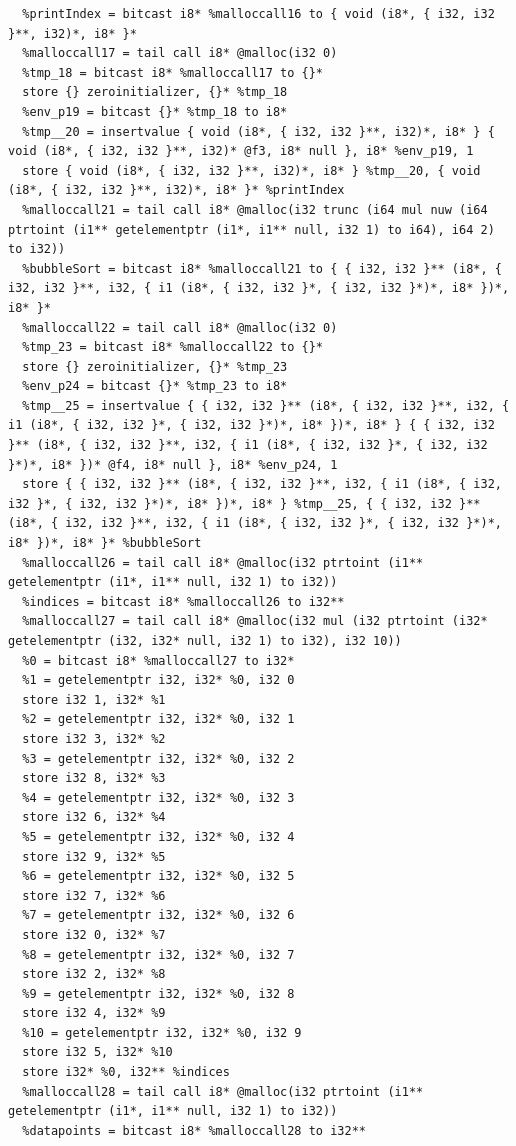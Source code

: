 \documentclass[12pt]{article}
\begin{document}
\begin{mdframed}[hidealllines=true,backgroundcolor=green!10]
\begin{lstlisting}
  %printIndex = bitcast i8* %malloccall16 to { void (i8*, { i32, i32 }**, i32)*, i8* }*
  %malloccall17 = tail call i8* @malloc(i32 0)
  %tmp_18 = bitcast i8* %malloccall17 to {}*
  store {} zeroinitializer, {}* %tmp_18
  %env_p19 = bitcast {}* %tmp_18 to i8*
  %tmp__20 = insertvalue { void (i8*, { i32, i32 }**, i32)*, i8* } { void (i8*, { i32, i32 }**, i32)* @f3, i8* null }, i8* %env_p19, 1
  store { void (i8*, { i32, i32 }**, i32)*, i8* } %tmp__20, { void (i8*, { i32, i32 }**, i32)*, i8* }* %printIndex
  %malloccall21 = tail call i8* @malloc(i32 trunc (i64 mul nuw (i64 ptrtoint (i1** getelementptr (i1*, i1** null, i32 1) to i64), i64 2) to i32))
  %bubbleSort = bitcast i8* %malloccall21 to { { i32, i32 }** (i8*, { i32, i32 }**, i32, { i1 (i8*, { i32, i32 }*, { i32, i32 }*)*, i8* })*, i8* }*
  %malloccall22 = tail call i8* @malloc(i32 0)
  %tmp_23 = bitcast i8* %malloccall22 to {}*
  store {} zeroinitializer, {}* %tmp_23
  %env_p24 = bitcast {}* %tmp_23 to i8*
  %tmp__25 = insertvalue { { i32, i32 }** (i8*, { i32, i32 }**, i32, { i1 (i8*, { i32, i32 }*, { i32, i32 }*)*, i8* })*, i8* } { { i32, i32 }** (i8*, { i32, i32 }**, i32, { i1 (i8*, { i32, i32 }*, { i32, i32 }*)*, i8* })* @f4, i8* null }, i8* %env_p24, 1
  store { { i32, i32 }** (i8*, { i32, i32 }**, i32, { i1 (i8*, { i32, i32 }*, { i32, i32 }*)*, i8* })*, i8* } %tmp__25, { { i32, i32 }** (i8*, { i32, i32 }**, i32, { i1 (i8*, { i32, i32 }*, { i32, i32 }*)*, i8* })*, i8* }* %bubbleSort
  %malloccall26 = tail call i8* @malloc(i32 ptrtoint (i1** getelementptr (i1*, i1** null, i32 1) to i32))
  %indices = bitcast i8* %malloccall26 to i32**
  %malloccall27 = tail call i8* @malloc(i32 mul (i32 ptrtoint (i32* getelementptr (i32, i32* null, i32 1) to i32), i32 10))
  %0 = bitcast i8* %malloccall27 to i32*
  %1 = getelementptr i32, i32* %0, i32 0
  store i32 1, i32* %1
  %2 = getelementptr i32, i32* %0, i32 1
  store i32 3, i32* %2
  %3 = getelementptr i32, i32* %0, i32 2
  store i32 8, i32* %3
  %4 = getelementptr i32, i32* %0, i32 3
  store i32 6, i32* %4
  %5 = getelementptr i32, i32* %0, i32 4
  store i32 9, i32* %5
  %6 = getelementptr i32, i32* %0, i32 5
  store i32 7, i32* %6
  %7 = getelementptr i32, i32* %0, i32 6
  store i32 0, i32* %7
  %8 = getelementptr i32, i32* %0, i32 7
  store i32 2, i32* %8
  %9 = getelementptr i32, i32* %0, i32 8
  store i32 4, i32* %9
  %10 = getelementptr i32, i32* %0, i32 9
  store i32 5, i32* %10
  store i32* %0, i32** %indices
  %malloccall28 = tail call i8* @malloc(i32 ptrtoint (i1** getelementptr (i1*, i1** null, i32 1) to i32))
  %datapoints = bitcast i8* %malloccall28 to i32**

\end{lstlisting}
\end{mdframed}
\end{document}
